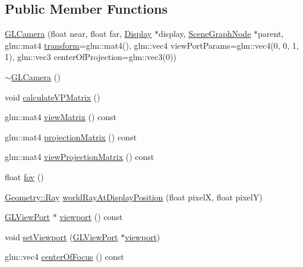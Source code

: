\subsection*{Public Member Functions}
\begin{DoxyCompactItemize}
\item 
\hyperlink{classmotorcar_1_1GLCamera_aaaf4065034f1f9a9a430c9f8e73d0708}{G\-L\-Camera} (float near, float far, \hyperlink{classmotorcar_1_1Display}{Display} $\ast$display, \hyperlink{classmotorcar_1_1SceneGraphNode}{Scene\-Graph\-Node} $\ast$parent, glm\-::mat4 \hyperlink{classmotorcar_1_1SceneGraphNode_ad96e79fdd739ac8223a3128003be391a}{transform}=glm\-::mat4(), glm\-::vec4 view\-Port\-Params=glm\-::vec4(0, 0, 1, 1), glm\-::vec3 center\-Of\-Projection=glm\-::vec3(0))
\item 
\hyperlink{classmotorcar_1_1GLCamera_a0622c29828396fc68be023b8c871e401}{$\sim$\-G\-L\-Camera} ()
\item 
void \hyperlink{classmotorcar_1_1GLCamera_a8f223614a636b9a9385d9acf2b8151f6}{calculate\-V\-P\-Matrix} ()
\item 
glm\-::mat4 \hyperlink{classmotorcar_1_1GLCamera_afd59fa3adac82a28eb786f2b70a6dbfa}{view\-Matrix} () const 
\item 
glm\-::mat4 \hyperlink{classmotorcar_1_1GLCamera_ab9391c9d7d91ea2b0a05a3881dc368c8}{projection\-Matrix} () const 
\item 
glm\-::mat4 \hyperlink{classmotorcar_1_1GLCamera_a8c737d347500a9a8aa5866098be545a4}{view\-Projection\-Matrix} () const 
\item 
float \hyperlink{classmotorcar_1_1GLCamera_a108d5a76c7855b25d8f93185e911b154}{fov} ()
\item 
\hyperlink{structmotorcar_1_1Geometry_1_1Ray}{Geometry\-::\-Ray} \hyperlink{classmotorcar_1_1GLCamera_a3253b3f3cb2e88b6e17c48744ea44766}{world\-Ray\-At\-Display\-Position} (float pixel\-X, float pixel\-Y)
\item 
\hyperlink{classmotorcar_1_1GLCamera_1_1GLViewPort}{G\-L\-View\-Port} $\ast$ \hyperlink{classmotorcar_1_1GLCamera_ab31d52c7ae376ef06f00d924461b7820}{viewport} () const 
\item 
void \hyperlink{classmotorcar_1_1GLCamera_ad3d5b539a4f8565c0c1cde9f00b4074c}{set\-Viewport} (\hyperlink{classmotorcar_1_1GLCamera_1_1GLViewPort}{G\-L\-View\-Port} $\ast$\hyperlink{classmotorcar_1_1GLCamera_ab31d52c7ae376ef06f00d924461b7820}{viewport})
\item 
glm\-::vec4 \hyperlink{classmotorcar_1_1GLCamera_a55aec53065d06faff1466aff35c20cdb}{center\-Of\-Focus} () const 
\end{DoxyCompactItemize}
